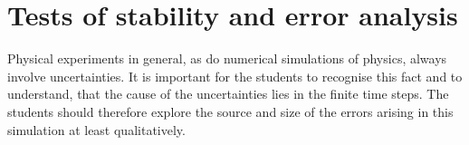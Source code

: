 \documentclass[12pt]{iopart}
\begin{document}
%
%
%

\section{Tests of stability and error analysis}\label{sec:stability}

Physical experiments in general, as do numerical simulations of physics, always involve uncertainties. It is important for the students to recognise this fact and to understand, that the cause of the uncertainties lies in the finite time steps. The students should therefore explore the source and size of the errors arising in this simulation at least qualitatively.
\end{document}
